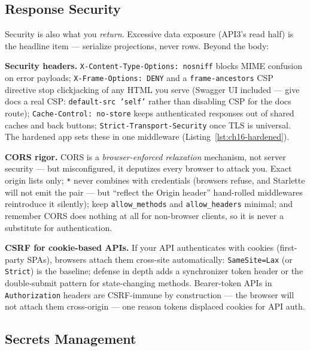 \subsection{Response Security}
\label{sec:ch16-response}

Security is also what you \emph{return}. Excessive data exposure (API3's
read half) is the headline item --- serialize projections, never rows.
Beyond the body:

\textbf{Security headers.} \texttt{X-Content-Type-Options: nosniff} blocks
MIME confusion on error payloads; \texttt{X-Frame-Options: DENY} and a
\texttt{frame-ancestors} CSP directive stop clickjacking of any HTML you
serve (Swagger UI included --- give docs a real CSP:
\texttt{default-src 'self'} rather than disabling CSP for the docs route);
\texttt{Cache-Control: no-store} keeps authenticated responses out of
shared caches and back buttons; \texttt{Strict-Transport-Security} once TLS
is universal. The hardened app sets these in one middleware
(Listing~\ref{lst:ch16-hardened}).

\textbf{CORS rigor.} CORS is a \emph{browser-enforced relaxation}
mechanism, not server security --- but misconfigured, it deputizes every
browser to attack you. Exact origin lists only; \texttt{*} never combines
with credentials (browsers refuse, and Starlette will not emit the pair
--- but ``reflect the Origin header'' hand-rolled middlewares reintroduce
it silently); keep \texttt{allow\_methods} and \texttt{allow\_headers}
minimal; and remember CORS does nothing at all for non-browser clients, so
it is never a substitute for authentication.

\textbf{CSRF for cookie-based APIs.} If your API authenticates with
cookies (first-party SPAs), browsers attach them cross-site automatically:
\texttt{SameSite=Lax} (or \texttt{Strict}) is the baseline; defense in
depth adds a synchronizer token header or the double-submit pattern for
state-changing methods. Bearer-token APIs in \texttt{Authorization}
headers are CSRF-immune by construction --- the browser will not attach
them cross-origin --- one reason tokens displaced cookies for API auth.

\subsection{Secrets Management}
\label{sec:ch16-secrets}

